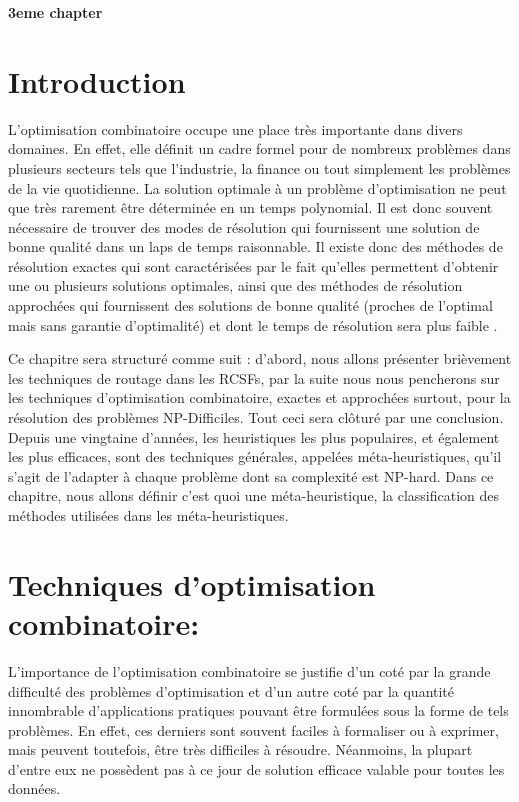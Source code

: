 \cleardoublepage


\setcounter{chapter}{3}
\setcounter{section}{0}
\setcounter{figure}{0}

\begin{center}
	\Huge\textbf{3eme chapter}
\end{center}

\section{Introduction}
L’optimisation combinatoire occupe une place très importante dans divers domaines. En effet, elle définit un cadre formel pour de nombreux problèmes dans plusieurs secteurs tels que l’industrie, la finance ou tout simplement les problèmes de la vie quotidienne.
La solution optimale à un problème d’optimisation ne peut que très rarement être déterminée en un temps polynomial. Il est donc souvent nécessaire de trouver des modes de résolution qui fournissent une solution de bonne qualité dans un laps de temps raisonnable. Il existe donc des méthodes de résolution exactes qui sont caractérisées par le fait qu’elles permettent d’obtenir une ou plusieurs solutions optimales, ainsi que des méthodes de résolution approchées qui fournissent des solutions de bonne qualité (proches de l’optimal mais sans garantie d’optimalité) et dont le temps de résolution sera plus faible \cite{zidi2006systeme}.

Ce chapitre sera structuré comme suit : d’abord, nous allons présenter brièvement les techniques de routage dans les RCSFs, par la suite nous nous pencherons sur les techniques d’optimisation combinatoire, exactes et approchées surtout, pour la résolution des problèmes NP-Difficiles. Tout ceci sera clôturé par une conclusion.\\
Depuis une vingtaine d’années, les heuristiques les plus populaires, et également les plus efficaces, sont des techniques générales, appelées méta-heuristiques, qu’il s’agit de l’adapter à chaque problème dont sa complexité est NP-hard. Dans ce chapitre, nous allons définir c’est quoi une méta-heuristique, la classification des méthodes utilisées dans les méta-heuristiques. 

\section{Techniques d’optimisation combinatoire:}
L’importance de l’optimisation combinatoire se justifie d’un coté par la grande difficulté des problèmes d’optimisation et d’un autre coté par la quantité innombrable d’applications pratiques pouvant être formulées sous la forme de tels problèmes. En effet, ces derniers sont souvent faciles à formaliser ou à exprimer, mais peuvent toutefois, être très difficiles à résoudre. Néanmoins, la plupart d’entre eux ne possèdent pas à ce jour de solution efficace valable pour toutes les données. \cite{hao1999metaheuristiques}

